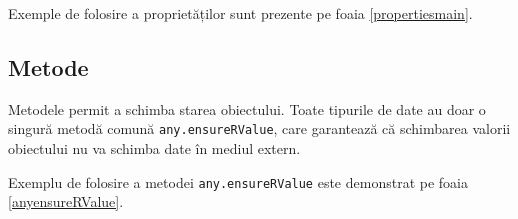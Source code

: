 Exemple de folosire a proprietăților sunt prezente pe foaia \ref{propertiesmain}.

\subsection{Metode}

Metodele permit a schimba starea obiectului. Toate tipurile de date au doar o singură metodă comună \texttt{any.ensureRValue}, care garantează că schimbarea valorii obiectului nu va schimba date în mediul extern.

Exemplu de folosire a metodei \texttt{any.ensureRValue} este demonstrat pe foaia \ref{anyensureRValue}.

\newpage
\begin{sourcecode}
    \label{propertiesmain}
    \inputminted[linenos]{icl}{../sources/propertiesmain.icL}
\end{sourcecode}


\begin{sourcecode}
    \label{anyensureRValue}
    \inputminted[linenos]{icl}{../sources/anyensureRValue.icL}
\end{sourcecode}
